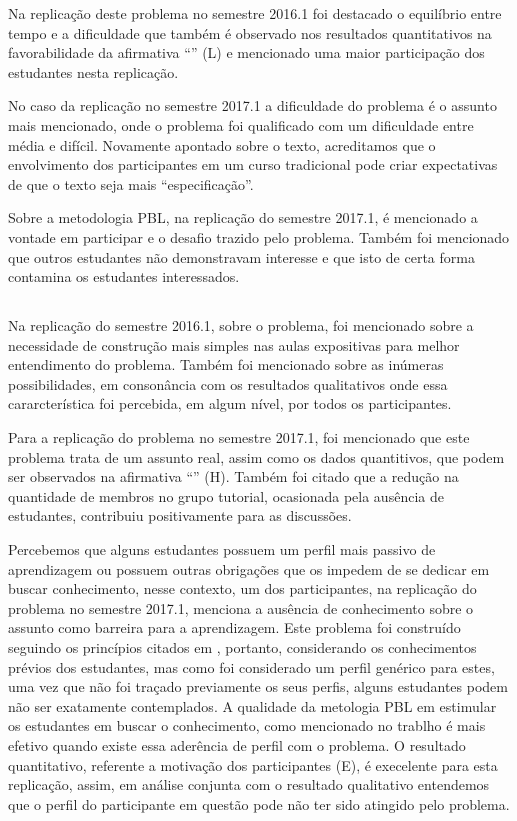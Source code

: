 Na replicação deste problema no semestre 2016.1
foi destacado o equilíbrio entre tempo e a dificuldade
que também é observado nos resultados quantitativos
na favorabilidade da afirmativa ``\LikertPL'' (L)
e mencionado uma maior participação
dos estudantes nesta replicação.

No caso da replicação no semestre 2017.1 a dificuldade
do problema é o assunto mais mencionado, onde o problema foi
qualificado com um dificuldade entre média e difícil.
Novamente apontado sobre o texto, acreditamos que o
envolvimento dos participantes em um curso
tradicional pode criar expectativas de que o texto
seja mais ``especificação''.

Sobre a metodologia PBL, na replicação do semestre 2017.1,
é mencionado a vontade em participar e o desafio trazido
pelo problema.
Também foi mencionado que outros estudantes não
demonstravam interesse e que isto de certa forma
contamina os estudantes interessados.

\subsection{\ProblemaD}

Na replicação do semestre 2016.1, sobre o problema, foi mencionado
sobre a necessidade de construção mais simples nas aulas
expositivas para melhor entendimento do problema.
Também foi mencionado sobre as inúmeras possibilidades, em consonância
com os resultados qualitativos onde essa cararcterística foi
percebida, em algum nível, por todos os participantes.

Para a replicação do problema no semestre 2017.1, foi mencionado
que este problema trata de um assunto real, assim como
os dados quantitivos, que podem ser observados
na afirmativa ``\LikertPH'' (H).
Também foi citado que a redução na quantidade de membros no grupo
tutorial, ocasionada pela ausência de estudantes, contribuiu
positivamente para as discussões.

Percebemos que alguns estudantes possuem um perfil mais passivo
de aprendizagem ou possuem outras obrigações que os impedem
de se dedicar em buscar conhecimento, nesse contexto,
um dos participantes, na replicação do problema no
semestre 2017.1, menciona a ausência de conhecimento
sobre o assunto como barreira para a aprendizagem.
Este problema foi construído seguindo
os princípios citados em \cite{dolmans1997seven},
portanto, considerando os conhecimentos prévios
dos estudantes, mas como foi considerado um perfil
genérico para estes, uma vez que não foi
traçado previamente os seus perfis, alguns estudantes
podem não ser exatamente contemplados.
A qualidade da metologia PBL em estimular os estudantes
em buscar o conhecimento, como mencionado no trablho
\cite{savery2015overview} é mais efetivo quando
existe essa aderência de perfil com o problema.
O resultado quantitativo, referente a motivação dos
participantes (E), é execelente para esta
replicação, assim, em análise conjunta com o
resultado qualitativo entendemos que o perfil
do participante em questão pode não ter sido
atingido pelo problema.

